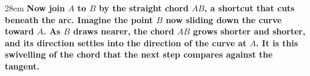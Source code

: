 \documentclass[border=4pt]{standalone}
\begin{document}
\begin{varwidth}{28em}
\large\bfseries
Now join $A$ to $B$ by \textcolor{chordgreen}{the straight chord $AB$}, a shortcut that cuts beneath \textcolor{arcblue}{the arc}. Imagine the point $B$ now sliding down \textcolor{arcblue}{the curve} toward $A$. As $B$ draws nearer, \textcolor{chordgreen}{the chord $AB$} grows shorter and shorter, and its direction settles into the direction of the curve at $A$. It is this swivelling of \textcolor{chordgreen}{the chord} that the next step compares against the tangent.
\end{varwidth}
\end{document}
